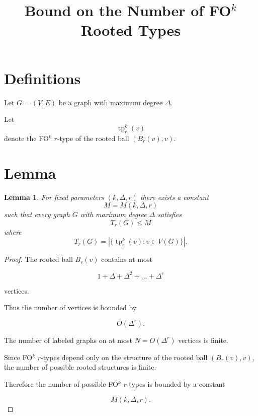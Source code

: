 \documentclass{article}
\newtheorem{lemma}{Lemma}
\begin{document}
\title{Bound on the Number of FO$^k$ Rooted Types}
\date{}
\maketitle

\section*{Definitions}

Let $G=(V,E)$ be a graph with maximum degree $\Delta$.

Let
\[
\operatorname{tp}^k_r(v)
\]
denote the FO$^k$ $r$-type of the rooted ball $(B_r(v),v)$.

\section*{Lemma}

\begin{lemma}
For fixed parameters $(k,\Delta,r)$ there exists a constant
\[
M=M(k,\Delta,r)
\]
such that every graph $G$ with maximum degree $\Delta$ satisfies
\[
T_r(G) \le M
\]
where
\[
T_r(G)=
\left|
\{
\operatorname{tp}^k_r(v):v\in V(G)
\}
\right|.
\]
\end{lemma}

\begin{proof}

The rooted ball $B_r(v)$ contains at most

\[
1+\Delta+\Delta^2+\dots+\Delta^r
\]

vertices.

Thus the number of vertices is bounded by

\[
O(\Delta^r).
\]

The number of labeled graphs on at most $N=O(\Delta^r)$ vertices is finite.

Since FO$^k$ $r$-types depend only on the structure of the rooted
ball $(B_r(v),v)$, the number of possible rooted structures is finite.

Therefore the number of possible FO$^k$ $r$-types is bounded by a
constant

\[
M(k,\Delta,r).
\]

\end{proof}
\end{document}
